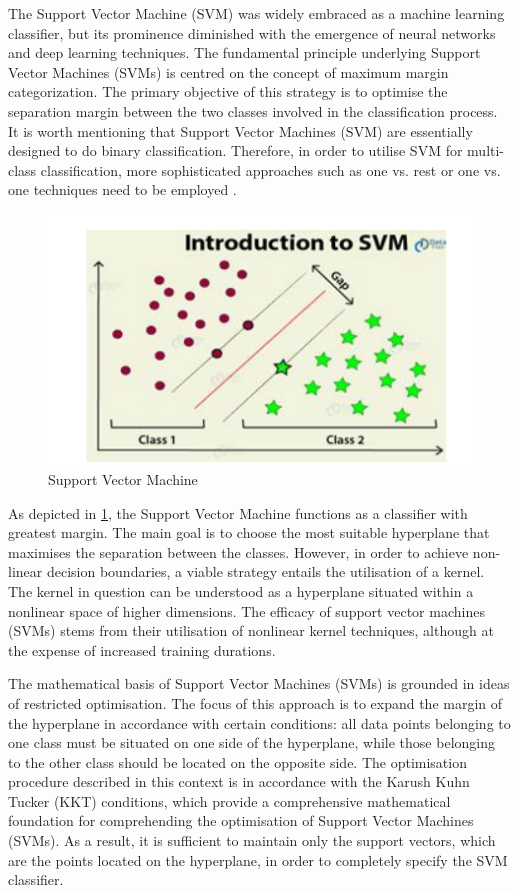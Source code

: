 The Support Vector Machine (SVM) was widely embraced as a machine learning classifier, but its prominence diminished with the emergence of neural networks and deep learning techniques. The fundamental principle underlying Support Vector Machines (SVMs) is centred on the concept of maximum margin categorization. The primary objective of this strategy is to optimise the separation margin between the two classes involved in the classification process. It is worth mentioning that Support Vector Machines (SVM) are essentially designed to do binary classification. Therefore, in order to utilise SVM for multi-class classification, more sophisticated approaches such as one vs. rest or one vs. one techniques need to be employed \cite{mahesh2020machine}.
\begin{figure}[htb]
\centerline{\includegraphics[width=1\textwidth]{SVMex.png}}
\caption{Support Vector Machine \cite{mahesh2020machine}}
\label{FigureSVM}
\end{figure}


As depicted in \ref{FigureSVM}, the Support Vector Machine functions as a classifier with greatest margin. The main goal is to choose the most suitable hyperplane that maximises the separation between the classes. However, in order to achieve non-linear decision boundaries, a viable strategy entails the utilisation of a kernel. The kernel in question can be understood as a hyperplane situated within a nonlinear space of higher dimensions. The efficacy of support vector machines (SVMs) stems from their utilisation of nonlinear kernel techniques, although at the expense of increased training durations.

The mathematical basis of Support Vector Machines (SVMs) is grounded in ideas of restricted optimisation. The focus of this approach is to expand the margin of the hyperplane in accordance with certain conditions: all data points belonging to one class must be situated on one side of the hyperplane, while those belonging to the other class should be located on the opposite side. The optimisation procedure described in this context is in accordance with the Karush Kuhn Tucker (KKT) conditions, which provide a comprehensive mathematical foundation for comprehending the optimisation of Support Vector Machines (SVMs).\cite{Thorsten} As a result, it is sufficient to maintain only the support vectors, which are the points located on the hyperplane, in order to completely specify the SVM classifier.

